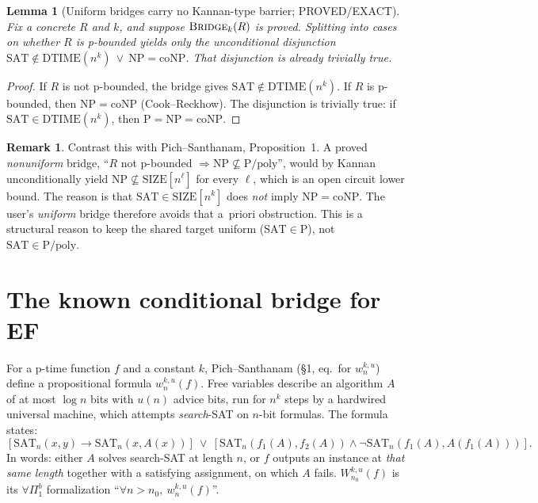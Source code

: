 \documentclass[11pt]{article}
\newtheorem{lemma}[theorem]{Lemma}
\theoremstyle{definition}
\newtheorem{remark}[theorem]{Remark}
\newcommand{\SAT}{\mathrm{SAT}}
\newcommand{\Time}{\mathrm{DTIME}}
\begin{document}
\begin{lemma}[Uniform bridges carry no Kannan-type barrier; PROVED/EXACT]\label{lem:nobarrier}
Fix a concrete $R$ and $k$, and suppose $\textsc{Bridge}_k(R)$ is proved. Splitting into cases
on whether $R$ is p-bounded yields only the unconditional disjunction
$\SAT\notin\Time(n^k)\ \vee\ \mathrm{NP}=\mathrm{coNP}$. That disjunction is already trivially
true.
\end{lemma}
\begin{proof}
If $R$ is not p-bounded, the bridge gives $\SAT\notin\Time(n^k)$. If $R$ is p-bounded, then
$\mathrm{NP}=\mathrm{coNP}$ (Cook--Reckhow). The disjunction is trivially true: if
$\SAT\in\Time(n^k)$, then $\mathrm P=\mathrm{NP}=\mathrm{coNP}$.
\end{proof}
\begin{remark}
Contrast this with Pich--Santhanam, Proposition~1. A proved \emph{nonuniform} bridge,
``$R$ not p-bounded $\Rightarrow\mathrm{NP}\not\subseteq\mathrm P/\mathrm{poly}$'', would by
Kannan unconditionally yield $\mathrm{NP}\not\subseteq\mathrm{SIZE}[n^\ell]$ for every $\ell$,
which is an open circuit lower bound. The reason is that $\SAT\in\mathrm{SIZE}[n^k]$ does
\emph{not} imply $\mathrm{NP}=\mathrm{coNP}$. The user's \emph{uniform} bridge therefore avoids
that a~priori obstruction. This is a structural reason to keep the shared target uniform
($\SAT\in\mathrm P$), not $\SAT\in\mathrm P/\mathrm{poly}$.
\end{remark}

\section{The known conditional bridge for EF}

For a p-time function $f$ and a constant $k$, Pich--Santhanam (\S1, eq.\ for $w^{k,u}_n$)
define a propositional formula $w^{k,u}_n(f)$. Free variables describe an algorithm $A$ of at
most $\log n$ bits with $u(n)$ advice bits, run for $n^k$ steps by a hardwired universal
machine, which attempts \emph{search}-SAT on $n$-bit formulas. The formula states:
\[
[\SAT_n(x,y)\to \SAT_n(x,A(x))]\ \vee\ [\SAT_n(f_1(A),f_2(A))\wedge\neg\SAT_n(f_1(A),A(f_1(A)))].
\]
In words: either $A$ solves search-SAT at length $n$, or $f$ outputs an instance at
\emph{that same length} together with a satisfying assignment, on which $A$ fails.
$W^{k,u}_{n_0}(f)$ is its $\forall\Pi^b_1$ formalization ``$\forall n>n_0,\ w^{k,u}_n(f)$''.
\end{document}
